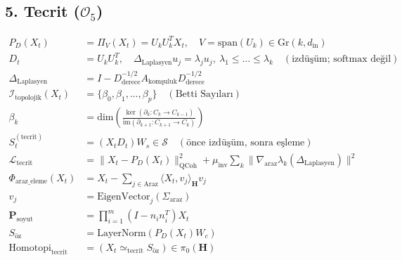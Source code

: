 \documentclass[11pt, a4paper]{article}
\begin{document}
\subsection{5. Tecrit ($\mathcal{O}_5$)}
\begin{align}
P_D(X_t) &= \Pi_V(X_t) = U_k U_k^T X_t, \quad V = \text{span}(U_k) \in \text{Gr}(k, d_{\text{in}}) \\
D_t &= U_k U_k^T, \quad \Delta_{\text{Laplasyen}} u_j = \lambda_j u_j, \ \lambda_1 \le \dots \le \lambda_k \quad (\text{izdüşüm; softmax değil}) \\
\Delta_{\text{Laplasyen}} &= I - D_{\text{derece}}^{-1/2} A_{\text{komşuluk}} D_{\text{derece}}^{-1/2} \\
\mathcal{I}_{\text{topolojik}}(X_t) &= \{ \beta_0, \beta_1, \dots, \beta_p \} \quad (\text{Betti Sayıları}) \\
\beta_k &= \text{dim}\left( \frac{\ker(\partial_k : C_k \to C_{k-1})}{\text{im}(\partial_{k+1} : C_{k+1} \to C_k)} \right) \\
S_t^{(\text{tecrit})} &= (X_t D_t) W_s \in \mathcal{S} \quad (\text{önce izdüşüm, sonra eşleme}) \\
\mathcal{L}_{\text{tecrit}} &= \| X_t - P_D(X_t) \|_{\text{QCoh}}^2 + \mu_{\text{inv}} \sum_k \|\nabla_{\text{araz}} \lambda_k(\Delta_{\text{Laplasyen}})\|^2 \\
\Phi_{\text{araz\_eleme}}(X_t) &= X_t - \sum_{j \in \text{Araz}} \langle X_t, v_j \rangle_{\mathbf{H}} v_j \\
v_j &= \text{EigenVector}_j(\Sigma_{\text{araz}}) \\
\mathbf{P}_{\text{soyut}} &= \prod_{i=1}^m (I - n_i n_i^T) X_t \\
S_{\text{öz}} &= \text{LayerNorm}(P_D(X_t) W_c) \\
\text{Homotopi}_{\text{tecrit}} &= (X_t \simeq_{\text{tecrit}} S_{\text{öz}}) \in \pi_0(\mathbf{H})
\end{align}
\end{document}
